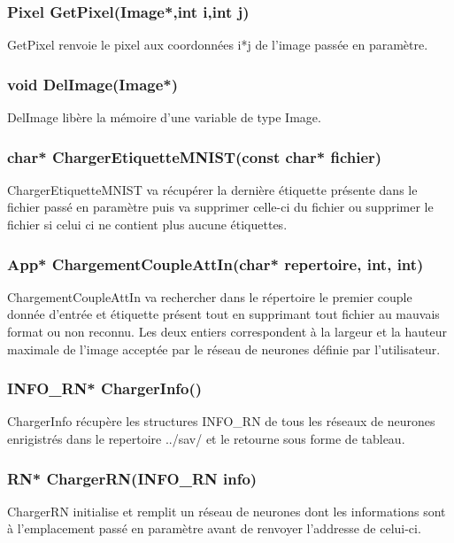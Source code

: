 \documentclass{article}
\begin{document}
		\subsubsection{\textcolor{myblue}{\textbf{Pixel}} GetPixel(\textcolor{myblue}{\textbf{Image*}},\textcolor{myblue}{\textbf{int}} i,\textcolor{myblue}{\textbf{int}} j)}
		GetPixel renvoie le pixel aux coordonnées i*j de l'image passée en paramètre.
		
		\subsubsection{\textcolor{myblue}{\textbf{void}} DelImage(\textcolor{myblue}{\textbf{Image*}})}
		DelImage libère la mémoire d'une variable de type Image.
		
		\subsubsection{\textcolor{myblue}{\textbf{char*}} ChargerEtiquetteMNIST(\textcolor{myblue}{\textbf{const char*}} fichier)}
		ChargerEtiquetteMNIST va récupérer la dernière étiquette présente dans le fichier passé en paramètre puis va supprimer celle-ci du fichier ou supprimer le fichier si celui ci ne contient plus aucune étiquettes.
		
		\subsubsection{\textcolor{myblue}{\textbf{App*}} ChargementCoupleAttIn(\textcolor{myblue}{\textbf{char*}} repertoire, \textcolor{myblue}{\textbf{int}}, \textcolor{myblue}{\textbf{int}})}
		ChargementCoupleAttIn va rechercher dans le répertoire le premier couple donnée d'entrée et étiquette présent tout en supprimant tout fichier au mauvais format ou non reconnu.
		Les deux entiers correspondent à la largeur et la hauteur maximale de l'image acceptée par le réseau de neurones définie par l'utilisateur.
		
		\subsubsection{\textcolor{myblue}{\textbf{INFO\_RN*}} ChargerInfo()}
		ChargerInfo récupère les structures INFO\_RN de tous les réseaux de neurones enrigistrés dans le repertoire ../sav/ et le retourne sous forme de tableau.
		
		\subsubsection{\textcolor{myblue}{\textbf{RN*}} ChargerRN(\textcolor{myblue}{\textbf{INFO\_RN}} info)}
		ChargerRN initialise et remplit un réseau de neurones dont les informations sont à l'emplacement passé en paramètre avant de renvoyer l'addresse de celui-ci.
		
\end{document}

